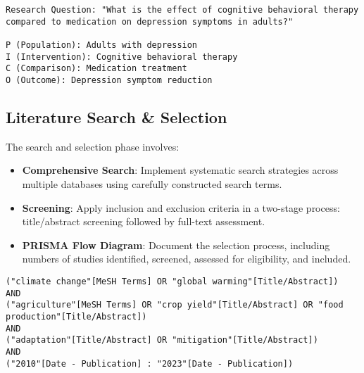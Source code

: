 \begin{commandbox}
\begin{lstlisting}
Research Question: "What is the effect of cognitive behavioral therapy compared to medication on depression symptoms in adults?"

P (Population): Adults with depression
I (Intervention): Cognitive behavioral therapy
C (Comparison): Medication treatment
O (Outcome): Depression symptom reduction
\end{lstlisting}
\end{commandbox}


\subsection{Literature Search \& Selection}

The search and selection phase involves:

\begin{itemize}
    \item \textbf{Comprehensive Search}: Implement systematic search strategies across multiple databases using carefully constructed search terms.
    \item \textbf{Screening}: Apply inclusion and exclusion criteria in a two-stage process: title/abstract screening followed by full-text assessment.
    \item \textbf{PRISMA Flow Diagram}: Document the selection process, including numbers of studies identified, screened, assessed for eligibility, and included.
\end{itemize}

\begin{commandbox}
\begin{lstlisting}
("climate change"[MeSH Terms] OR "global warming"[Title/Abstract])
AND
("agriculture"[MeSH Terms] OR "crop yield"[Title/Abstract] OR "food production"[Title/Abstract])
AND
("adaptation"[Title/Abstract] OR "mitigation"[Title/Abstract])
AND
("2010"[Date - Publication] : "2023"[Date - Publication])
\end{lstlisting}
\end{commandbox}


